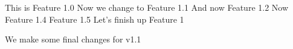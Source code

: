 This is Feature 1.0
Now we change to Feature 1.1
And now Feature 1.2
Now Feature 1.4
Feature 1.5
Let's finish up Feature 1

We make some final changes for v1.1
